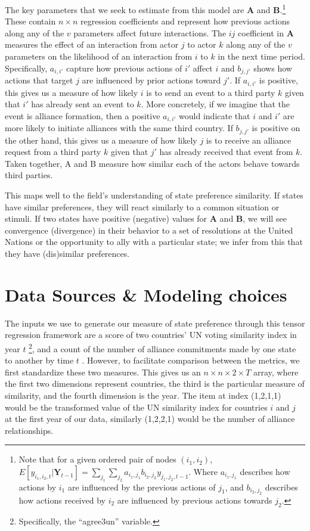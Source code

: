 \documentclass[12pt,pdflatex]{elsarticle}
\newcommand{\bl}[1]{{\mathbf #1}}
\begin{document}
The key parameters that we seek to estimate from this model are $\bl A$ and $\bl B$.\footnote{Note that for a given ordered pair of nodes $(i_{1},i_{2})$, $E[y_{i_{1},i_{2},t} | \bl Y_{t-1}] = \sum_{j_{1}} \sum_{j_{2}} a_{i_{1},j_{1}} b_{i_{2},j_{2}} y_{j_{1},j_{2},t-1}$. Where $a_{i_{1},j_{1}}$ describes how actions by $i_{1}$ are influenced by the previous actions of $j_{1}$, and $b_{i_{2},j_{2}}$ describes how actions received by $i_{2}$ are influenced by previous actions towards $j_{2}$.} These contain $n \times n$ regression coefficients and represent how previous actions along any of the $v$ parameters affect future interactions. The $ij$ coefficient in $\bl A$ measures the effect of an interaction from actor $j$ to actor $k$ along any of the $v$ parameters on the likelihood of an interaction from $i$ to $k$ in the next time period. Specifically, $a_{i,i'}$ capture how previous actions of $i'$ affect $i$ and $b_{j,j'}$ shows how actions that target $j$ are influenced by prior actions toward $j'$. If $a_{i,i'}$ is positive, this gives us a measure of how likely $i$ is to send an event to a third party $k$ given that $i'$ has already sent an event to $k$. More concretely, if we imagine that the event is alliance formation, then a positive $a_{i,i'}$ would indicate that $i$ and $i'$ are more likely to initiate alliances with the same third country. If $b_{j,j'}$ is positive on the other hand, this gives us a measure of how likely $j$ is to receive an alliance request from a third party $k$ given that $j'$ has already received that event from $k$. Taken together, A and B measure how similar each of the actors behave towards third parties.

This maps well to the field's understanding of state preference similarity. If states have similar preferences, they will react similarly to a common situation or stimuli. If two states have positive (negative) values for $\bl A$ and $\bl B$, we will see convergence (divergence) in their behavior to a set of resolutions at the United Nations or the opportunity to ally with a particular state; we infer from this that they have (dis)similar preferences.

\section*{Data Sources \& Modeling choices}

The inputs we use to generate our measure of state preference through this tensor regression framework are a score of two countries' UN voting similarity index in year $t$ \citep{voeten:2013}\footnote{Specifically, the ``agree3un'' variable.}, and a count of the number of alliance commitments made by one state to another by time $t$ \citep{gibler:sarkees:2004}. However, to facilitate comparison between the metrics, we first standardize these two measures. This gives us an $n \times n \times 2 \times T$ array, where the first two dimensions represent countries, the third is the particular measure of similarity, and the fourth dimension is the year. The item at index (1,2,1,1) would be the transformed value of the UN similarity index for countries $i$ and $j$ at the first year of our data, similarly (1,2,2,1) would be the number of alliance relationships.
\end{document}

